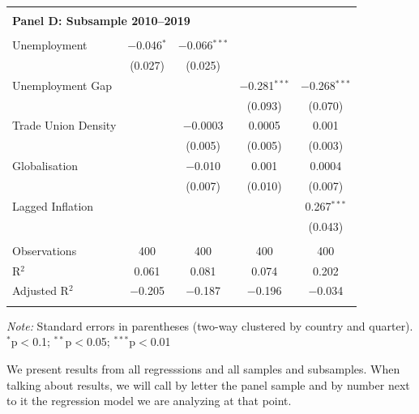 \documentclass[preprint,10pt,authoryear]{elsarticle}
\begin{document}
\begin{table}[H]
\begin{minipage}[t]{0.48\textwidth}
{\begin{tabular}{lcccc}
\hline\\[-1.8ex]
\multicolumn{5}{l}{\textbf{Panel D: Subsample 2010--2019}} \\
\hline\\[-1.8ex]
Unemployment        & $-$0.046$^{*}$   & $-$0.066$^{***}$ &                  &                  \\
                    & (0.027)          & (0.025)          &                  &                  \\
Unemployment Gap    &                  &                  & $-$0.281$^{***}$ & $-$0.268$^{***}$ \\
                    &                  &                  & (0.093)          & (0.070)          \\
Trade Union Density &                  & $-$0.0003        & 0.0005           & 0.001            \\
                    &                  & (0.005)          & (0.005)          & (0.003)          \\
Globalisation       &                  & $-$0.010         & 0.001            & 0.0004           \\
                    &                  & (0.007)          & (0.010)          & (0.007)          \\
Lagged Inflation    &                  &                  &                  & 0.267$^{***}$    \\
                    &                  &                  &                  & (0.043)          \\
\hline\\[-1.8ex]
Observations     & 400      & 400      & 400      & 400      \\
R$^{2}$          & 0.061    & 0.081    & 0.074    & 0.202    \\
Adjusted R$^{2}$ & $-$0.205 & $-$0.187 & $-$0.196 & $-$0.034 \\
\hline\hline\\[-1.8ex]
\end{tabular}}
\end{minipage}

\vspace{4pt}
{\footnotesize\textit{Note:} Standard errors in parentheses (two-way clustered by country and quarter). $^{*}$p$<$0.1; $^{**}$p$<$0.05; $^{***}$p$<$0.01}
\end{table}


We present results from all regresssions and all samples and subsamples. When talking about results, we will call by letter the panel sample and by number next to it the regression model we are analyzing at that point.
\end{document}
